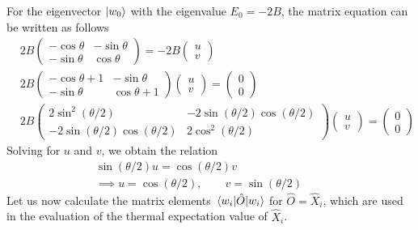 \documentclass[../thesis_main.tex]{subfiles}
\begin{document}
For the eigenvector $\ket{w_0}$  with the eigenvalue $E_0 = -2B$, the matrix equation can be written as follows
\begingroup
\allowdisplaybreaks
\begin{align}
    & 2B \left(\begin{array}{cc}
    -\cos \theta  & -\sin \theta  \\ 
    -\sin \theta  & \cos \theta 
    \end{array}\right) = -2B 
    \left(\begin{array}{c}
    u \\ 
    v
    \end{array}\right) \nonumber\\
    & 2B \left(\begin{array}{cc}
    -\cos \theta +1 & -\sin \theta  \\ 
    - \sin \theta  & \cos \theta + 1
    \end{array}\right)
    \left(\begin{array}{c}
    u \\ 
    v
    \end{array}\right) = 
    \left(\begin{array}{c}
    0 \\ 
    0
    \end{array}\right) \nonumber\\ 
    & 2B \left(\begin{array}{cc}
    2 \sin^2(\theta/2) & -2\sin(\theta /2) \cos(\theta /2) \\ 
    -2 \sin(\theta /2) \cos(\theta /2) & 2 \cos^2(\theta /2)
    \end{array}\right) 
    \left(\begin{array}{c}
    u \\ 
    v
    \end{array}\right) = 
    \left(\begin{array}{c}
    0 \\ 
    0
    \end{array}\right)
\end{align}
\endgroup
Solving for $u$ and $v$, we obtain the relation 
\begin{gather}
    \sin (\theta /2) u = \cos (\theta /2) v \nonumber \\
    \implies u = \cos(\theta /2), \qquad v = \sin (\theta /2) \qquad
\end{gather}
Let us now calculate the matrix elements $\mel{w_i}{\hat{O}}{w_i}$ for $\hat{O} = \hat{X}_i$, which are used in the evaluation of the thermal expectation value of $\hat{X}_i$.
\end{document}
